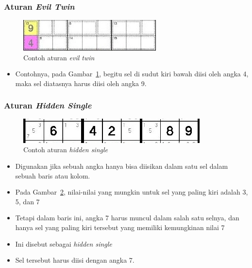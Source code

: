 \documentclass{beamer}
\begin{document}

\begin{frame}
\frametitle{Aturan \textit{Evil Twin}}
\begin{figure}
\centering
\captionsetup{justification=centering}
\includegraphics[scale=1]{Gambar/HybridGenetic3}
\caption[Contoh aturan  \textit{evil twin}]{Contoh aturan  \textit{evil twin}}
\label{fig:hybrid3}
\end{figure}
\begin{itemize}
\item Contohnya, pada Gambar~\ref{fig:hybrid3}, begitu sel di sudut kiri bawah diisi oleh angka 4, maka sel diatasnya harus diisi oleh angka 9.
\end{itemize}
\end{frame}


\begin{frame}
\frametitle{Aturan \textit{Hidden Single}}
\begin{figure}
\centering
\captionsetup{justification=centering}
\includegraphics[scale=1]{Gambar/HybridGenetic4}
\caption[Contoh aturan  \textit{hidden single}]{Contoh aturan  \textit{hidden single}}
\label{fig:hybrid4}
\end{figure}
\begin{itemize}
\item Digunakan jika sebuah angka hanya bisa diisikan dalam satu sel dalam sebuah baris atau kolom.
\item Pada Gambar~\ref{fig:hybrid4}, nilai-nilai yang mungkin untuk sel yang paling kiri adalah 3, 5, dan 7
\item Tetapi dalam baris ini, angka 7 harus muncul dalam salah satu selnya, dan hanya sel yang paling kiri tersebut yang memiliki kemungkinan nilai 7
\item Ini disebut sebagai \textit{hidden single}
\item Sel tersebut harus diisi dengan angka 7.
\end{itemize}
\end{frame}
\end{document}
